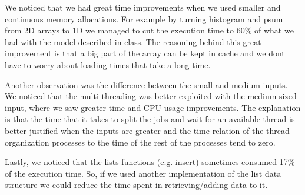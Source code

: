 \documentclass{ws-ijprai}
\begin{document}
\tab We noticed that we had great time improvements when we used smaller and continuous memory allocations. For example by turning histogram and psum from 2D arrays to 1D we managed to cut the execution time to 60\% of what we had with the model described in class. The reasoning behind this great improvement is that a big part of the array can be kept in cache and we don\textquotesingle t have to worry about loading times that take a long time.

\tab Another observation was the difference between the small and medium inputs. We noticed that the multi threading was better exploited with the medium sized input, where we saw greater time and CPU usage improvements. The explanation is that the time that it takes to split the jobs and wait for an available thread is better justified when the inputs are greater and the time relation of the thread organization processes to the time of the rest of the processes tend to zero.

\tab Lastly, we noticed that the list\textquotesingle s functions (e.g. insert) sometimes consumed 17\% of the execution time. So, if we used another implementation of the list data structure we could reduce the time spent in retrieving/adding data to it.
\end{document}
